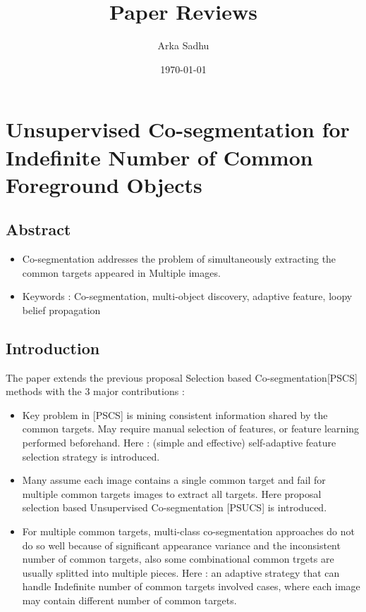 \documentclass{article}
\title{Paper Reviews}
\author{
  Arka Sadhu}
\date{\today}
\begin{document}
\maketitle

\tableofcontents
\newpage

\section{Unsupervised Co-segmentation for Indefinite Number of Common Foreground Objects}
\cite{7401081}
\subsection{Abstract}
\begin{itemize}
\item Co-segmentation addresses the problem of simultaneously extracting the common targets appeared in Multiple images.
\item Keywords : Co-segmentation, multi-object discovery, adaptive feature, loopy belief propagation
\end{itemize}

\subsection{Introduction}
The paper extends the previous proposal Selection based Co-segmentation[PSCS] methods with the 3 major contributions :
\begin{itemize}
\item Key problem in [PSCS] is mining consistent information shared by the common targets. May require manual selection of features, or feature learning performed beforehand. Here : (simple and effective) self-adaptive feature selection strategy is introduced.
\item Many assume each image contains a single common target and fail for multiple common targets images to extract all targets. Here proposal selection based Unsupervised Co-segmentation [PSUCS] is introduced.
\item For multiple common targets, multi-class co-segmentation approaches do not do so well because of significant appearance variance and the inconsistent number of common targets, also some combinational common trgets are usually splitted into multiple pieces. Here : an adaptive strategy that can handle Indefinite number of common targets involved cases, where each image may contain different number of common targets.
\end{itemize}
\end{document}

